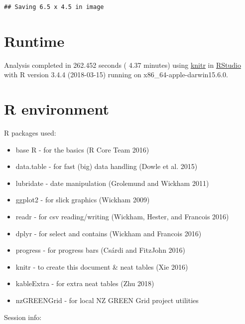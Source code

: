 \documentclass[]{article}
\providecommand{\tightlist}{%
  \setlength{\itemsep}{0pt}\setlength{\parskip}{0pt}}
\begin{document}
\begin{verbatim}
## Saving 6.5 x 4.5 in image
\end{verbatim}

\section{Runtime}\label{runtime}

Analysis completed in 262.452 seconds ( 4.37 minutes) using
\href{https://cran.r-project.org/package=knitr}{knitr} in
\href{http://www.rstudio.com}{RStudio} with R version 3.4.4 (2018-03-15)
running on x86\_64-apple-darwin15.6.0.

\section{R environment}\label{r-environment}

R packages used:

\begin{itemize}
\tightlist
\item
  base R - for the basics (R Core Team 2016)
\item
  data.table - for fast (big) data handling (Dowle et al. 2015)
\item
  lubridate - date manipulation (Grolemund and Wickham 2011)
\item
  ggplot2 - for slick graphics (Wickham 2009)
\item
  readr - for csv reading/writing (Wickham, Hester, and Francois 2016)
\item
  dplyr - for select and contains (Wickham and Francois 2016)
\item
  progress - for progress bars (Csárdi and FitzJohn 2016)
\item
  knitr - to create this document \& neat tables (Xie 2016)
\item
  kableExtra - for extra neat tables (Zhu 2018)
\item
  nzGREENGrid - for local NZ GREEN Grid project utilities
\end{itemize}

Session info:
\end{document}
